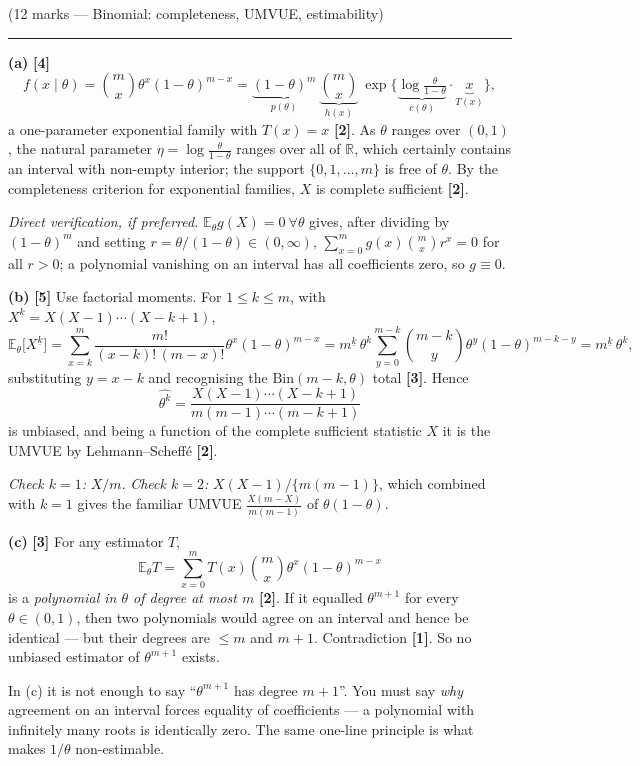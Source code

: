 \documentclass[11pt]{article}
\newcommand{\E}{\mathbb{E}}
\newcommand{\R}{\mathbb{R}}
\newcommand{\mk}[1]{{\small\color{ForestGreen}\textbf{[#1]}}}
\newcommand{\qhead}[2]{\bigskip\noindent{\large\bfseries Question #1}\quad\textnormal{\small(#2)}\par
  \vspace{2pt}\hrule\vspace{6pt}}
\begin{document}
\qhead{2}{12 marks --- Binomial: completeness, UMVUE, estimability}

\noindent\textbf{(a)} \mk{4}
\[
f(x\mid\theta)=\binom mx\theta^{x}(1-\theta)^{m-x}
=\underbrace{(1-\theta)^{m}}_{p(\theta)}\ \underbrace{\binom mx}_{h(x)}\
\exp\Big\{\underbrace{\log\tfrac{\theta}{1-\theta}}_{c(\theta)}\cdot\underbrace{x}_{T(x)}\Big\},
\]
a one-parameter exponential family with $T(x)=x$ \mk{2}. As $\theta$ ranges over $(0,1)$, the
natural parameter $\eta=\log\frac{\theta}{1-\theta}$ ranges over all of $\R$, which certainly
contains an interval with non-empty interior; the support $\{0,1,\dots,m\}$ is free of
$\theta$. By the completeness criterion for exponential families, $X$ is complete sufficient
\mk{2}.

\emph{Direct verification, if preferred.} $\E_\theta g(X)=0\ \forall\theta$ gives, after
dividing by $(1-\theta)^m$ and setting $r=\theta/(1-\theta)\in(0,\infty)$,
$\sum_{x=0}^m g(x)\binom mx r^{x}=0$ for all $r>0$; a polynomial vanishing on an interval has
all coefficients zero, so $g\equiv0$.

\smallskip\noindent\textbf{(b)} \mk{5}
Use factorial moments. For $1\le k\le m$, with
$X^{\underline k}=X(X-1)\cdots(X-k+1)$,
\[
\E_\theta\big[X^{\underline k}\big]
=\sum_{x=k}^{m}\frac{m!}{(x-k)!\,(m-x)!}\theta^{x}(1-\theta)^{m-x}
=m^{\underline k}\,\theta^{k}\sum_{y=0}^{m-k}\binom{m-k}{y}\theta^{y}(1-\theta)^{m-k-y}
=m^{\underline k}\,\theta^{k},
\]
substituting $y=x-k$ and recognising the $\mathrm{Bin}(m-k,\theta)$ total \mk{3}. Hence
\[
\boxed{\ \widehat{\theta^{k}}=\frac{X(X-1)\cdots(X-k+1)}{m(m-1)\cdots(m-k+1)}\ }
\]
is unbiased, and being a function of the complete sufficient statistic $X$ it is the UMVUE by
Lehmann--Scheff\'e \mk{2}.

\emph{Check $k=1$:} $X/m$. \emph{Check $k=2$:} $X(X-1)/\{m(m-1)\}$, which combined with $k=1$
gives the familiar UMVUE $\frac{X(m-X)}{m(m-1)}$ of $\theta(1-\theta)$.

\smallskip\noindent\textbf{(c)} \mk{3}
For any estimator $T$,
\[
\E_\theta T=\sum_{x=0}^{m}T(x)\binom mx\theta^{x}(1-\theta)^{m-x}
\]
is a \emph{polynomial in $\theta$ of degree at most $m$} \mk{2}. If it equalled
$\theta^{m+1}$ for every $\theta\in(0,1)$, then two polynomials would agree on an interval and
hence be identical --- but their degrees are $\le m$ and $m+1$. Contradiction \mk{1}. So no
unbiased estimator of $\theta^{m+1}$ exists.

\begin{trapbox}
In (c) it is not enough to say ``$\theta^{m+1}$ has degree $m+1$''. You must say \emph{why}
agreement on an interval forces equality of coefficients --- a polynomial with infinitely many
roots is identically zero. The same one-line principle is what makes $1/\theta$ non-estimable.
\end{trapbox}
\end{document}
